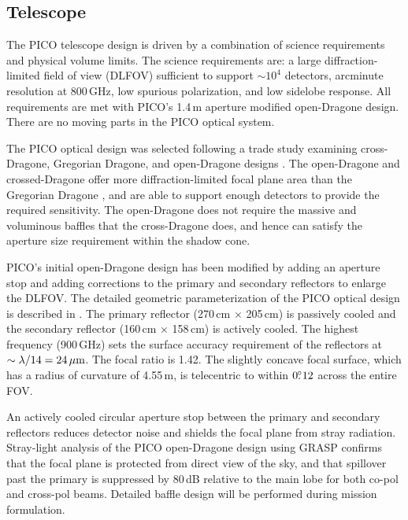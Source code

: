 \subsection{Telescope}
\label{sec:telescope} %

The PICO telescope design is driven by a combination of science
requirements and physical volume limits. The science requirements are:
a large diffraction-limited field of view (DLFOV) sufficient to
support $\sim10^4$ detectors, arcminute resolution at 800\,GHz, low
spurious polarization, and low sidelobe response. All
requirements are met with PICO's 1.4\,m aperture modified open-Dragone
design. There are no moving parts in the PICO optical system.

The PICO optical design was selected following a trade study examining
cross-Dragone, Gregorian Dragone, and open-Dragone designs
\citep{Young2018}.  The open-Dragone and crossed-Dragone offer more
diffraction-limited focal plane area than the Gregorian Dragone
\citep{deBernardis2018}, and are able to support enough detectors to
provide the required sensitivity. The open-Dragone does not require
the massive and voluminous baffles that the cross-Dragone does, and
hence can satisfy the aperture size requirement within the shadow
cone.

PICO's initial open-Dragone design has been modified by adding an
aperture stop and adding corrections to the primary and secondary
reflectors to enlarge the DLFOV. The detailed geometric
parameterization of the PICO optical design is described in
\cite{Young2018}. The primary reflector (270\,cm $\times$ 205\,cm) is
passively cooled and the secondary reflector (160\,cm $\times$
158\,cm) is actively cooled. The highest frequency (900\,GHz) sets the
surface accuracy requirement of the reflectors at
$\sim \lambda/14 =24\,\mu{\rm m}$. The focal ratio is 1.42. The
slightly concave focal surface, which has a radius of curvature of
4.55\,m, is telecentric to within $0.\!\!^\circ12$ across the entire FOV.

An actively cooled circular aperture stop between the primary and
secondary reflectors reduces detector noise and shields the focal
plane from stray radiation. Stray-light analysis of the PICO
open-Dragone design using GRASP confirms that the focal plane is
protected from direct view of the sky, and that spillover past the
primary is suppressed by 80\,dB relative to the main lobe for both
co-pol and cross-pol beams. Detailed baffle design will be performed
during mission formulation.


